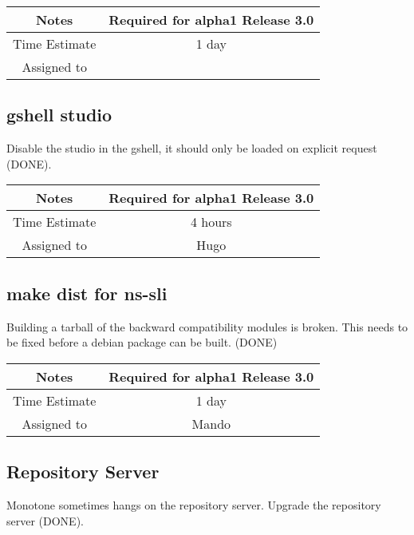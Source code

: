 \documentclass[12pt]{article}
\begin{document}
{
  \vspace{5mm}
  \centering
  \begin{tabular}{|c|c|}
    \hline
    Notes
    & Required for alpha1 Release 3.0 \\
    \hline
    Time Estimate
    & 1 day \\
    \hline
    Assigned to
    & \\
    \hline
  \end{tabular}
}


\subsection{gshell studio}

Disable the studio in the gshell, it should only be loaded on explicit
request (DONE).

{
  \vspace{5mm}
  \centering
  \begin{tabular}{|c|c|}
    \hline
    Notes
    & Required for alpha1 Release 3.0 \\
    \hline
    Time Estimate
    & 4 hours \\
    \hline
    Assigned to
    & Hugo \\
    \hline
  \end{tabular}
}


\subsection{make dist for ns-sli}

Building a tarball of the backward compatibility modules is broken.
This needs to be fixed before a debian package can be built. (DONE)

{
  \vspace{5mm}
  \centering
  \begin{tabular}{|c|c|}
    \hline
    Notes
    & Required for alpha1 Release 3.0 \\
    \hline
    Time Estimate
    & 1 day \\
    \hline
    Assigned to
    & Mando \\
    \hline
  \end{tabular}
}


\subsection{Repository Server}
\label{sec:repository-server}
Monotone sometimes hangs on the repository server.  Upgrade the
repository server (DONE).
\end{document}
